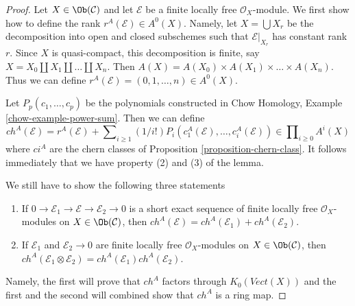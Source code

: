 \begin{proof}
Let $X \in \Ob(\mathcal{C})$ and let $\mathcal{E}$ be a finite
locally free $\mathcal{O}_X$-module. We first show how to define
the rank $r^A(\mathcal{E}) \in A^0(X)$. Namely, let $X = \bigcup X_r$
be the decomposition into open and closed subschemes such that
$\mathcal{E}|_{X_r}$ has constant rank $r$. Since $X$ is quasi-compact, this
decomposition is finite, say $X = X_0 \amalg X_1 \amalg \ldots \amalg X_n$.
Then $A(X) = A(X_0) \times A(X_1) \times \ldots \times A(X_n)$. Thus we
can define $r^A(\mathcal{E}) = (0, 1, \ldots, n) \in A^0(X)$.

\medskip\noindent
Let $P_p(c_1, \ldots, c_p)$ be the polynomials constructed in
Chow Homology, Example \ref{chow-example-power-sum}.
Then we can define
$$
ch^A(\mathcal{E}) = r^A(\mathcal{E}) +
\sum\nolimits_{i \geq 1} (1/i!)
P_i(c^A_1(\mathcal{E}), \ldots, c^A_i(\mathcal{E}))
\in \prod\nolimits_{i \geq 0} A^i(X)
$$
where $ci^A$ are the chern classes of
Proposition \ref{proposition-chern-class}.
It follows immediately that we have property (2) and (3) of the lemma.

\medskip\noindent
We still have to show the following three statements
\begin{enumerate}
\item If $0 \to \mathcal{E}_1 \to \mathcal{E} \to \mathcal{E}_2 \to 0$
is a short exact sequence of finite locally free $\mathcal{O}_X$-modules
on $X \in \Ob(\mathcal{C})$, then
$ch^A(\mathcal{E}) = ch^A(\mathcal{E}_1) + ch^A(\mathcal{E}_2)$.
\item If $\mathcal{E}_1$ and $\mathcal{E}_2 \to 0$ are finite locally free
$\mathcal{O}_X$-modules on $X \in \Ob(\mathcal{C})$, then
$ch^A(\mathcal{E}_1 \otimes \mathcal{E}_2) =
ch^A(\mathcal{E}_1) ch^A(\mathcal{E}_2)$.
\end{enumerate}
Namely, the first will prove that $ch^A$ factors through
$K_0(\textit{Vect}(X))$ and the first and the second will combined
show that $ch^A$ is a ring map.


\end{proof}
